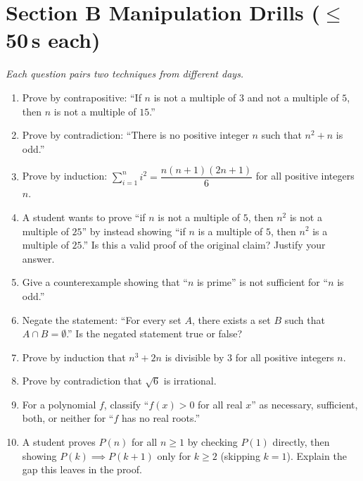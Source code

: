 \documentclass[11pt,a4paper]{article}
\begin{document}
\section*{Section B \quad Manipulation Drills \hfill{\normalfont\small($\leq$50\,s each)}}

\noindent\textit{Each question pairs two techniques from different days.}

\begin{enumerate}

\item Prove by contrapositive: ``If $n$ is not a multiple of $3$ and not a multiple of $5$, then $n$ is not a multiple of $15$.''

\item Prove by contradiction: ``There is no positive integer $n$ such that $n^2+n$ is odd.''

\item Prove by induction: $\sum_{i=1}^n i^2=\dfrac{n(n+1)(2n+1)}{6}$ for all positive integers $n$.

\item A student wants to prove ``if $n$ is not a multiple of $5$, then $n^2$ is not a multiple of $25$'' by instead showing ``if $n$ is a multiple of $5$, then $n^2$ is a multiple of $25$.'' Is this a valid proof of the original claim? Justify your answer.

\item Give a counterexample showing that ``$n$ is prime'' is not sufficient for ``$n$ is odd.''

\item Negate the statement: ``For every set $A$, there exists a set $B$ such that $A\cap B=\emptyset$.'' Is the negated statement true or false?

\item Prove by induction that $n^3+2n$ is divisible by $3$ for all positive integers $n$.

\item Prove by contradiction that $\sqrt6$ is irrational.

\item For a polynomial $f$, classify ``$f(x)>0$ for all real $x$'' as necessary, sufficient, both, or neither for ``$f$ has no real roots.''

\item A student proves $P(n)$ for all $n\geq1$ by checking $P(1)$ directly, then showing $P(k)\implies P(k+1)$ only for $k\geq2$ (skipping $k=1$). Explain the gap this leaves in the proof.

\end{enumerate}
\end{document}
